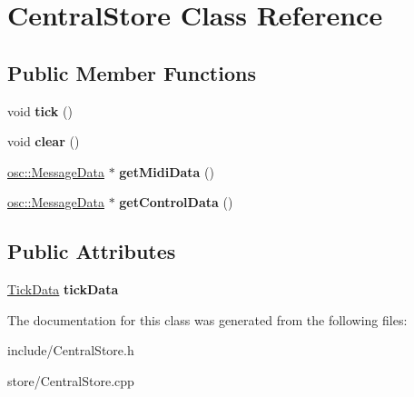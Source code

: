 \hypertarget{classCentralStore}{}\section{Central\+Store Class Reference}
\label{classCentralStore}
\subsection*{Public Member Functions}
\begin{DoxyCompactItemize}
\item 
void {\bfseries tick} ()\hypertarget{classCentralStore_ab809e0f4e90d4d8d1873a89f3da889b3}{}\label{classCentralStore_ab809e0f4e90d4d8d1873a89f3da889b3}

\item 
void {\bfseries clear} ()\hypertarget{classCentralStore_a100ae6ad2506d4962d23966e23a1c78e}{}\label{classCentralStore_a100ae6ad2506d4962d23966e23a1c78e}

\item 
\hyperlink{classosc_1_1MessageData}{osc\+::\+Message\+Data} $\ast$ {\bfseries get\+Midi\+Data} ()\hypertarget{classCentralStore_a910470f5eec98b92b82a4cb2f1c5f386}{}\label{classCentralStore_a910470f5eec98b92b82a4cb2f1c5f386}

\item 
\hyperlink{classosc_1_1MessageData}{osc\+::\+Message\+Data} $\ast$ {\bfseries get\+Control\+Data} ()\hypertarget{classCentralStore_a3faaea58a012d25efaa710fa3d1942b7}{}\label{classCentralStore_a3faaea58a012d25efaa710fa3d1942b7}

\end{DoxyCompactItemize}
\subsection*{Public Attributes}
\begin{DoxyCompactItemize}
\item 
\hyperlink{structTickData}{Tick\+Data} {\bfseries tick\+Data}\hypertarget{classCentralStore_a6f0c4050f0983924bbad8c631746f8b7}{}\label{classCentralStore_a6f0c4050f0983924bbad8c631746f8b7}

\end{DoxyCompactItemize}


The documentation for this class was generated from the following files\+:\begin{DoxyCompactItemize}
\item 
include/Central\+Store.\+h\item 
store/Central\+Store.\+cpp\end{DoxyCompactItemize}
